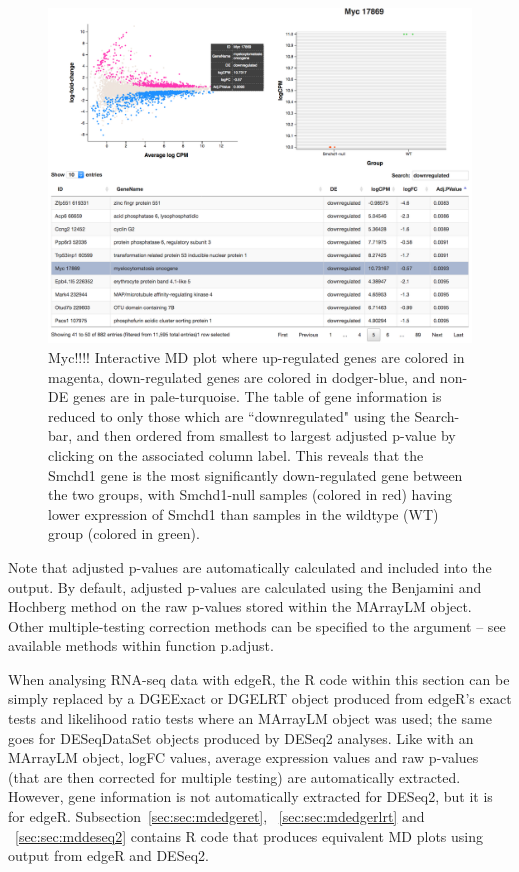 \documentclass{article}
\newcommand{\Rarg}[1]{\textcolor{BlueGreen}{{\sf{#1}}}}
\begin{document}
\begin{figure}[!ht]
  \centerline{\includegraphics[width=0.7\linewidth]{MDplot_anno_myc.png}}
  \caption{Myc!!!! Interactive MD plot where up-regulated genes are colored in magenta, down-regulated genes are colored in dodger-blue, and non-DE genes are in pale-turquoise. The table of gene information is reduced to only those which are ``downregulated" using the Search-bar, and then ordered from smallest to largest adjusted p-value by clicking on the associated column label. This reveals that the Smchd1 gene is the most significantly down-regulated gene between the two groups, with Smchd1-null samples (colored in red) having lower expression of Smchd1 than samples in the wildtype (WT) group (colored in green).}
  \label{fig:MDcoloranno}
\end{figure}

Note that adjusted p-values are automatically calculated and included into the output. By default, adjusted p-values are calculated using the Benjamini and Hochberg method \cite{bh} on the raw p-values stored within the MArrayLM object. Other multiple-testing correction methods can be specified to the \Rarg{p.adj.method} argument -- see available methods within function {\sf p.adjust}.

When analysing RNA-seq data with edgeR, the R code within this section can be simply replaced by a {\sf DGEExact} or {\sf DGELRT} object produced from edgeR's exact tests and likelihood ratio tests where an {\sf MArrayLM} object was used; the same goes for {\sf DESeqDataSet} objects produced by DESeq2 analyses. Like with an {\sf MArrayLM} object, logFC values, average expression values and raw p-values (that are then corrected for multiple testing) are automatically extracted. However, gene information is not automatically extracted for DESeq2, but it is for edgeR. Subsection~\ref{sec:sec:mdedgeret}, ~\ref{sec:sec:mdedgerlrt} and ~\ref{sec:sec:mddeseq2} contains R code that produces equivalent MD plots using output from edgeR and DESeq2.
\end{document}
